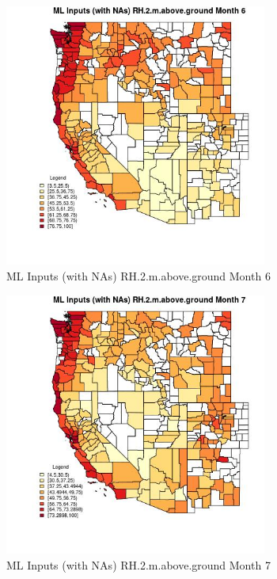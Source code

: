 \begin{figure} 
\centering  
\includegraphics[width=0.77\textwidth]{Code_Outputs/Report_ML_input_PM25_Step4_part_f_de_duplicated_aveswNAs_CountyRH2mabovegroundmedianMonth6.jpg} 
\caption{\label{fig:Report_ML_input_PM25_Step4_part_f_de_duplicated_aveswNAsCountyRH2mabovegroundmedianMonth6}ML Inputs (with NAs) RH.2.m.above.ground Month 6} 
\end{figure} 
 

\begin{figure} 
\centering  
\includegraphics[width=0.77\textwidth]{Code_Outputs/Report_ML_input_PM25_Step4_part_f_de_duplicated_aveswNAs_CountyRH2mabovegroundmedianMonth7.jpg} 
\caption{\label{fig:Report_ML_input_PM25_Step4_part_f_de_duplicated_aveswNAsCountyRH2mabovegroundmedianMonth7}ML Inputs (with NAs) RH.2.m.above.ground Month 7} 
\end{figure} 
 

